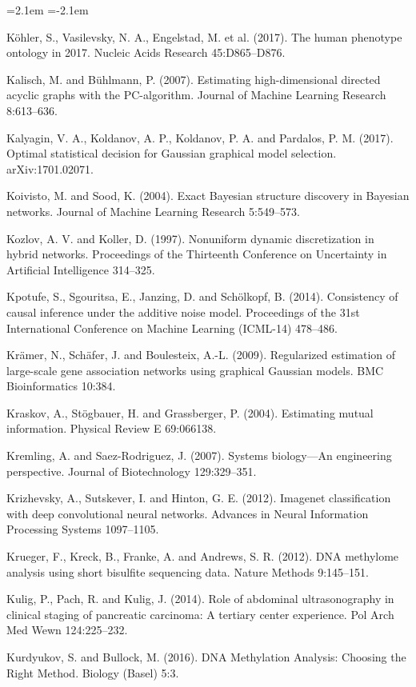\begin{list}{}{\leftmargin=2.1em  
  \itemindent=-2.1em \parsep=0pt \itemsep=2pt \topsep=0pt}
\item Köhler, S., Vasilevsky, N. A., Engelstad, M. et al. (2017). The human phenotype ontology in 2017. Nucleic Acids Research 45:D865--D876.
\item Kalisch, M. and Bühlmann, P. (2007). Estimating high-dimensional directed acyclic graphs with the PC-algorithm. Journal of Machine Learning Research 8:613--636.
\item Kalyagin, V. A., Koldanov, A. P., Koldanov, P. A. and Pardalos, P. M. (2017). Optimal statistical decision for Gaussian graphical model selection. arXiv:1701.02071.
\item Koivisto, M. and Sood, K. (2004). Exact Bayesian structure discovery in Bayesian networks. Journal of Machine Learning Research 5:549--573.
\item Kozlov, A. V. and Koller, D. (1997). Nonuniform dynamic discretization in hybrid networks. Proceedings of the Thirteenth Conference on Uncertainty in Artificial Intelligence 314--325.
\item Kpotufe, S., Sgouritsa, E., Janzing, D. and Schölkopf, B. (2014). Consistency of causal inference under the additive noise model. Proceedings of the 31st International Conference on Machine Learning (ICML-14) 478--486.
\item Krämer, N., Schäfer, J. and Boulesteix, A.-L. (2009). Regularized estimation of large-scale gene association networks using graphical Gaussian models. BMC Bioinformatics 10:384.
\item Kraskov, A., Stögbauer, H. and Grassberger, P. (2004). Estimating mutual information. Physical Review E 69:066138.
\item Kremling, A. and Saez-Rodriguez, J. (2007). Systems biology---An engineering perspective. Journal of Biotechnology 129:329--351.
\item Krizhevsky, A., Sutskever, I. and Hinton, G. E. (2012). Imagenet classification with deep convolutional neural networks. Advances in Neural Information Processing Systems 1097--1105.
\item Krueger, F., Kreck, B., Franke, A. and Andrews, S. R. (2012). DNA methylome analysis using short bisulfite sequencing data. Nature Methods 9:145--151.
\item Kulig, P., Pach, R. and Kulig, J. (2014). Role of abdominal ultrasonography in clinical staging of pancreatic carcinoma: A tertiary center experience. Pol Arch Med Wewn 124:225--232.
\item Kurdyukov, S. and Bullock, M. (2016). DNA Methylation Analysis: Choosing the Right Method. Biology (Basel) 5:3.

\end{list}
